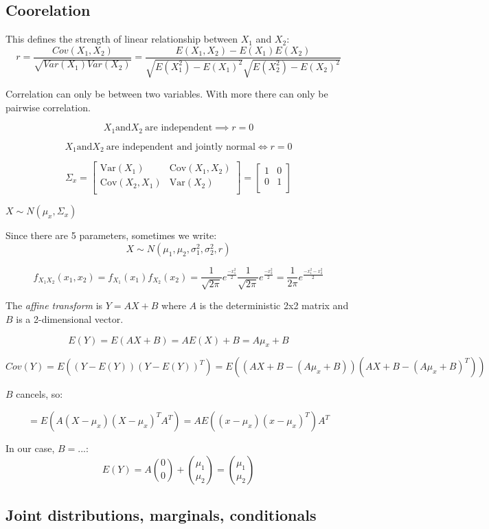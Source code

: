 \documentclass{report}
\begin{document}
\subsection{Coorelation}


This defines the strength of linear relationship between $X_1$ and $X_2$:
$$r = \frac{Cov(X_1, X_2)}{\sqrt{Var(X_1)Var(X_2)}} = \frac{E(X_1, X_2) - E(X_1)E(X_2)}{\sqrt{E(X_1^2) - E(X_1)^2} \sqrt{E(X_2^2) - E(X_2)^2}}$$

Correlation can only be between two variables. With more there can only be pairwise correlation.

$$X_1 \text{and} X_2\ \text{are independent} \implies r=0$$

$$X_1 \text{and} X_2\ \text{are independent and jointly normal} \iff  r=0$$

$$ \Sigma_x = 
\begin{bmatrix}
\text{Var}(X_1) & \text{Cov}(X_1, X_2) \\
\text{Cov}(X_2, X_1) & \text{Var}(X_2) \\
\end{bmatrix} =  
\begin{bmatrix}
1 & 0 \\
0 & 1 \\
\end{bmatrix}
$$ 

$X \sim N(\mu_x, \Sigma_x)$

Since there are 5 parameters, sometimes we write: $$X \sim N(\mu_1, \mu_2, \sigma_1^2, \sigma_2^2, r)$$

$$f_{X_1 X_2} (x_1, x_2) = f_{X_1} (x_1) f_{X_2} (x_2) = \frac{1}{\sqrt{2\pi}}e^{\frac{-x_1^2}{2}} \frac{1}{\sqrt{2\pi}}e^{\frac{-x_2^2}{2}} = \frac{1}{2\pi}e^{\frac{-x_1^2 - x_2^2}{2}} $$

The \textit{affine transform} is $Y=AX+B$ where $A$ is the deterministic 2x2 matrix and $B$ is a 2-dimensional vector.

$$E(Y) = E(AX+B) = AE(X) + B = A \mu_x + B$$

$$Cov(Y) = E( (Y-E(Y))(Y-E(Y))^T) = E( (AX+B - (A \mu_x + B))(AX+B - (A \mu_x + B)^T))$$

$B$ cancels, so: 

$$ = E(A(X-\mu_x)(X-\mu_x)^T A^T) = A E((x-\mu_x)(x-\mu_x)^T)A^T$$

In our case, $B = ...$: $$E(Y) = A{0 \choose 0} + {\mu_1 \choose \mu_2} =  {\mu_1 \choose \mu_2}$$


\subsection{Joint distributions, marginals, conditionals}
\end{document}
